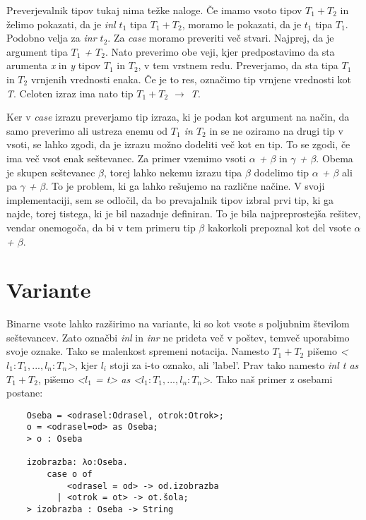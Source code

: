 \documentclass[12pt,a4paper,openany]{book}
\begin{document}
Preverjevalnik tipov tukaj nima težke naloge. Če imamo vsoto tipov \(T_1 + T_2\) in želimo pokazati, da je \emph{inl $t_1$} tipa \emph{$T_1 + T_2$}, moramo le pokazati, da je 
\emph{$t_1$} tipa \emph{$T_1$}. Podobno velja za \emph{inr $t_2$}. Za \emph{case} moramo preveriti več stvari. Najprej, da je argument tipa \emph{$T_1$ + $T_2$}. Nato preverimo 
obe veji, kjer predpostavimo da sta arumenta \emph{x} in \emph{y} tipov \emph{$T_1$} in \emph{$T_2$}, v tem vrstnem redu. Preverjamo, da sta tipa \emph{$T_1$} in \emph{$T_2$} 
vrnjenih vrednosti enaka. Če je to res, označimo tip vrnjene vrednosti kot \emph{T}. Celoten izraz ima nato tip \emph{$T_1 + T_2$ $\rightarrow$ T}.

Ker v \emph{case} izrazu preverjamo tip izraza, ki je podan kot argument na način, da samo preverimo ali ustreza enemu od \emph{\(T_1\) in \(T_2\)} in se ne oziramo na drugi tip v vsoti, 
se lahko zgodi, da je izrazu možno dodeliti več kot en tip. To se zgodi, če ima več vsot enak seštevanec. Za primer vzemimo vsoti \emph{$\alpha$ + $\beta$} in \emph{$\gamma$ + $\beta$}.
Obema je skupen seštevanec \emph{$\beta$}, torej lahko nekemu izrazu tipa \emph{$\beta$} dodelimo tip \emph{$\alpha$ + $\beta$} ali pa \emph{$\gamma$ + $\beta$}. To je problem, ki ga
lahko rešujemo na različne načine. V svoji implementaciji, sem se odločil, da bo prevajalnik tipov izbral prvi tip, ki ga najde, torej tistega, ki je bil nazadnje definiran. To je bila 
najpreprostejša rešitev, vendar onemogoča, da bi v tem primeru tip \emph{$\beta$} kakorkoli prepoznal kot del vsote \emph{$\alpha$ + $\beta$}.

\section{Variante}
Binarne vsote lahko razširimo na variante, ki so kot vsote s poljubnim številom seštevancev. Zato označbi \emph{inl} in \emph{inr} ne prideta več v poštev, temveč uporabimo svoje oznake. 
Tako se malenkost spremeni notacija. Namesto \emph{$T_1 + T_2$} pišemo \emph{<$l_1:T_1, ... , l_n:T_n$>}, kjer \(l_i\) stoji za i-to oznako, ali 'label'. Prav tako namesto \emph{inl t as 
$T_1 + T_2$}, pišemo \emph{<$l_1$ = t> as <$l_1:T_1, ... , l_n:T_n$>}. Tako naš primer z osebami postane:
\begin{lstlisting}
    Oseba = <odrasel:Odrasel, otrok:Otrok>;
    o = <odrasel=od> as Oseba;
    > o : Oseba

    izobrazba: λo:Oseba.
        case o of
            <odrasel = od> -> od.izobrazba
          | <otrok = ot> -> ot.šola;
    > izobrazba : Oseba -> String
\end{lstlisting}
\end{document}
